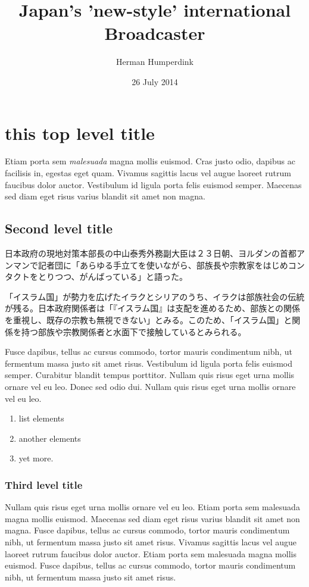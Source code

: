 \documentclass[11pt, headings=normal]{scrartcl}
\title{Japan's 'new-style' international Broadcaster}
\author{Herman Humperdink}
\date{26 July 2014}
\begin{document}
\maketitle


\section{this top level title}\label{this-top-level-title}

Etiam porta sem \emph{malesuada} magna mollis euismod. Cras justo odio, dapibus
ac facilisis in, egestas eget quam. Vivamus sagittis lacus vel augue
laoreet rutrum faucibus dolor auctor. Vestibulum id ligula porta felis
euismod semper. Maecenas sed diam eget risus varius blandit sit amet non
magna.

\subsection{Second level title}\label{second-level-title}

日本政府の現地対策本部長の中山泰秀外務副大臣は２３日朝、ヨルダンの首都アンマンで記者団に「あらゆる手立てを使いながら、部族長や宗教家をはじめコンタクトをとりつつ、がんばっている」と語った。

「イスラム国」が勢力を広げたイラクとシリアのうち、イラクは部族社会の伝統が残る。日本政府関係者は「『イスラム国』は支配を進めるため、部族との関係を重視し、既存の宗教も無視できない」とみる。このため、「イスラム国」と関係を持つ部族や宗教関係者と水面下で接触しているとみられる。

Fusce dapibus, tellus ac cursus commodo, tortor mauris condimentum nibh,
ut fermentum massa justo sit amet risus. Vestibulum id ligula porta
felis euismod semper. Curabitur blandit tempus porttitor. Nullam quis
risus eget urna mollis ornare vel eu leo. Donec sed odio dui. Nullam
quis risus eget urna mollis ornare vel eu leo.\citep{Asai:2011}

\begin{enumerate}
\item  list elements
\item  another elements
\item  yet more.
\end{enumerate}

\subsubsection{Third level title}

Nullam quis risus eget urna mollis ornare vel eu leo. Etiam porta sem
malesuada magna mollis euismod. Maecenas sed diam eget risus varius
blandit sit amet non magna. Fusce dapibus, tellus ac cursus commodo,\citep{Biltereyst:1995}
tortor mauris condimentum nibh, ut fermentum massa justo sit amet risus.
Vivamus sagittis lacus vel augue laoreet rutrum faucibus dolor auctor.
Etiam porta sem malesuada magna mollis euismod. Fusce dapibus, tellus ac
cursus commodo, tortor mauris condimentum nibh, ut fermentum massa justo
sit amet risus.

\renewcommand\refname{References}

  
\end{document}
